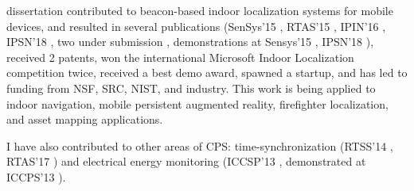 \documentclass[10pt]{article}
\begin{document}
dissertation contributed to beacon-based indoor localization systems
for mobile devices, and resulted in several publications (SenSys'15 \cite{lazik2015alps},
RTAS'15 \cite{rtas-alps-platform}, IPIN'16 \cite{rajagopal2016beacon}, IPSN'18 \cite{rajagopal2018enhancing}, two under submission \cite{mobileAR, beaconplacementtheory}, demonstrations at
Sensys'15 \cite{lazik2015alpsdemo}, IPSN'18 \cite{rajagopal2018welcome}), received 2 patents, won the international
Microsoft Indoor Localization competition twice, received a best demo
award, spawned a startup, and has led to funding from NSF, SRC, NIST, and
industry. This work is being applied to indoor navigation, mobile
persistent augmented reality, firefighter localization, and asset
mapping applications.  

I have also contributed to other areas of CPS:
time-synchronization (RTSS'14 \cite{buevich2013hardware}, RTAS'17 \cite{dongare2017pulsar}) and electrical energy
monitoring (ICCSP'13 \cite{rajagopal2013magnetic}, demonstrated at ICCPS'13 \cite{rajagopal2013demo}).








 


\end{document}

